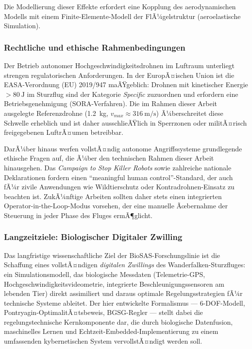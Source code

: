 ﻿\documentclass[12pt,a4paper]{article}
\theoremstyle{remark}
\begin{document}
	Die Modellierung dieser Effekte erfordert eine Kopplung des aerodynamischen Modells mit einem Finite-Elemente-Modell der FlÃ¼gelstruktur (aeroelastische Simulation).

	\subsubsection{Rechtliche und ethische Rahmenbedingungen}

	Der Betrieb autonomer Hochgeschwindigkeitsdrohnen im Luftraum unterliegt strengen regulatorischen Anforderungen. In der EuropÃ¤ischen Union ist die EASA-Verordnung (EU) 2019/947 maÃŸgeblich: Drohnen mit kinetischer Energie $> \SI{80}{\J}$ im Sturzflug sind der Kategorie \textit{Specific} zuzuordnen und erfordern eine Betriebsgenehmigung (SORA-Verfahren). Die im Rahmen dieser Arbeit ausgelegte Referenzdrohne (\SI{1.2}{\kg}, $v_{max} \approx \SI{316}{\m\per\second}$) Ã¼berschreitet diese Schwelle erheblich und ist daher ausschlieÃŸlich in Sperrzonen oder militÃ¤risch freigegebenen LuftrÃ¤umen betreibbar.

	DarÃ¼ber hinaus werfen vollstÃ¤ndig autonome Angriffssysteme grundlegende ethische Fragen auf, die Ã¼ber den technischen Rahmen dieser Arbeit hinausgehen. Das \textit{Campaign to Stop Killer Robots} sowie zahlreiche nationale Deklarationen fordern einen ``meaningful human control''-Standard, der auch fÃ¼r zivile Anwendungen wie Wildtierschutz oder Kontradrohnen-Einsatz zu beachten ist. ZukÃ¼nftige Arbeiten sollten daher stets einen integrierten Operator-in-the-Loop-Modus vorsehen, der eine manuelle Ãœbernahme der Steuerung in jeder Phase des Fluges ermÃ¶glicht.

	\subsubsection{Langzeitziele: Biologischer Digitaler Zwilling}

	Das langfristige wissenschaftliche Ziel der BioSAS-Forschungslinie ist die Schaffung eines vollstÃ¤ndigen \textit{digitalen Zwillings} des Wanderfalken-Sturzfluges: ein Simulationsmodell, das biologische Messdaten (Telemetrie-GPS, Hochgeschwindigkeitsvideometrie, integrierte Beschleunigungssensoren am lebenden Tier) direkt assimiliert und daraus optimale Regelungsstrategien fÃ¼r technische Systeme ableitet. Der hier entwickelte Formalismus --- 6-DOF-Modell, Pontryagin-OptimalitÃ¤tsbeweis, BGSG-Regler --- stellt dabei die regelungstechnische Kernkomponente dar, die durch biologische Datenfusion, maschinelles Lernen und Echtzeit-Embedded-Implementierung zu einem umfassenden kybernetischen System vervollstÃ¤ndigt werden soll.
	
\end{document}
